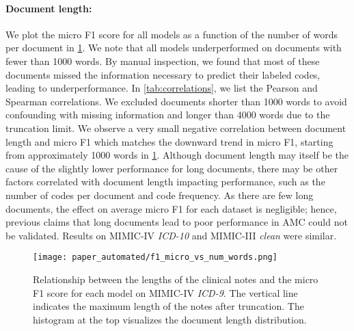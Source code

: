 {\paragraph{Document length:}\label{subsubsec:document-length}

We plot the micro F1 score for all models as a function of the number of words per document in \cref{fig:text_length}. 
We note that all models underperformed on documents with fewer than 1000 words. 
By manual inspection, we found that most of these documents missed the information necessary to predict their labeled codes, leading to underperformance. 
In \cref{tab:correlations}, we list the Pearson and Spearman correlations. We excluded documents shorter than 1000 words to avoid confounding with missing information and longer than 4000 words due to the truncation limit. We observe a very small negative correlation between document length and micro F1 which matches the downward trend in micro F1, starting from approximately 1000 words in \cref{fig:text_length}. 
Although document length may itself be the cause of the slightly lower performance for long documents, there may be other factors correlated with document length impacting performance, such as the number of codes per document and code frequency.
As there are few long documents, the effect on average micro F1 for each dataset is negligible; hence, previous claims that long documents lead to poor performance in AMC could not be validated. Results on MIMIC-IV \textit{ICD-10} and MIMIC-III \textit{clean} were similar.

\begin{figure}[t]
    \centering
    \texttt{[image: paper\_automated/f1\_micro\_vs\_num\_words.png]}
    \caption[Relationship between the lengths of the clinical notes and the micro F1 score for each model on MIMIC-IV \textit{ICD-9}]{Relationship between the lengths of the clinical notes and the micro F1 score for each model on MIMIC-IV \textit{ICD-9}. The vertical line indicates the maximum length of the notes after truncation. The histogram at the top visualizes the document length distribution.}
    \label{fig:text_length}
\end{figure}

}
